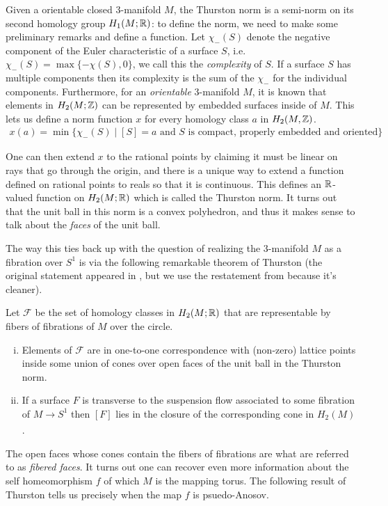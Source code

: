 Given a orientable closed $3$-manifold $M$, the Thurston norm is a semi-norm on its second homology
group $H_1(M; \mathbb{R})$: to define the norm, we need to make some preliminary remarks and define a
function.  Let $\chi_-(S)$ denote the negative component of the Euler characteristic of a surface
$S$, i.e. $\chi_-(S) = \max\{-\chi(S),0\}$, we call this the \textit{complexity} of $S$. If a
surface $S$ has multiple components then its complexity is the sum of the $\chi_-$ for the
individual components.  Furthermore, for an \emph{orientable} 3-manifold $M$, it is known that
elements in $H_2(M ; \mathbb{Z})$ can be represented by embedded surfaces inside of $M$. This lets us
define a norm function $x$ for every homology class $a$ in $H_2(M, \mathbb{Z})$.
\begin{align*}
  x(a) = \min\{\chi_-(S) \mid [S] = a \text{ and $S$ is compact, properly embedded and oriented}\}
\end{align*}

One can then extend $x$ to the rational points by claiming it must be linear on rays that go through
the origin, and there is a unique way to extend a function defined on rational points to reals so
that it is continuous. This defines an $\mathbb{R}$-valued function on $H_2(M; \mathbb{R})$ which is called the
Thurston norm. It turns out that the unit ball in this norm is a convex polyhedron, and thus it makes
sense to talk about the \emph{faces} of the unit ball.

The way this ties back up with the question of realizing the $3$-manifold $M$ as a fibration over
$S^1$ is via the following remarkable theorem of Thurston (the original statement appeared in
\cite{thurston1986norm}, but we use the restatement from \cite{yazdi2018pseudo} because it's
cleaner).

\begin{thm}[Thurston]
  \label{thm:Thur1}
  Let $\mathcal{F}$ be the set of homology classes in $H_2(M; \mathbb{R})$ that are representable by fibers of
  fibrations of $M$ over the circle.
\begin{enumerate}[(i)]
\item Elements of $\mathcal{F}$ are in one-to-one correspondence with (non-zero) lattice points
  inside some union of cones over open faces of the unit ball in the Thurston norm.
\item If a surface $F$ is transverse to the suspension flow associated to some fibration of
  $M \xrightarrow[]{} S^1$ then $[F]$ lies in the closure of the corresponding cone in $H_2(M)$.
\end{enumerate}
\end{thm}
The open faces whose cones contain the fibers of fibrations are what are referred to as \emph{fibered faces}.
It turns out one can recover even more information about the self homeomorphism $f$ of which $M$ is the
mapping torus. The following result of Thurston tells us precisely when the map $f$ is psuedo-Anosov.

